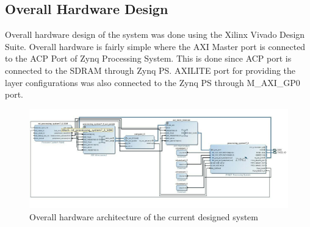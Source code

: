 \documentclass[12pt,a4paper]{report}
\begin{document}
\subsection{Overall Hardware Design}
Overall hardware design of the system was done using the Xilinx Vivado Design Suite. Overall hardware is fairly simple where the AXI Master port is connected to the ACP Port of Zynq Processing System. This is done since ACP port is connected to the SDRAM through Zynq PS. AXILITE port for providing the layer configurations was also connected to the Zynq PS through M\_AXI\_GP0 port.
\begin{figure}[H]
\includegraphics[width=15cm]{hardware.jpg}
\centering
\caption{Overall hardware architecture of the current designed system}
\label{hardware}
\end{figure}
\end{document}
